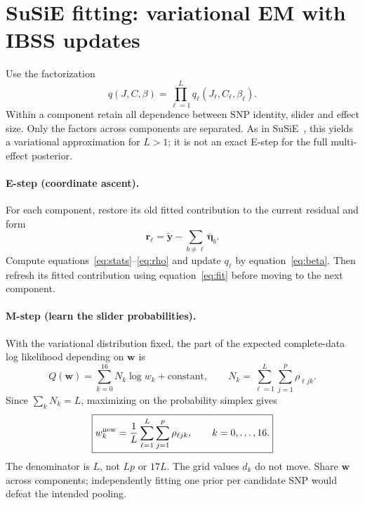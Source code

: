 \documentclass[11pt]{article}
\newcommand{\yb}{\widetilde{\mathbf y}}
\newcommand{\etal}{\overline{\boldsymbol\eta}}
\begin{document}
\newpage
\section{SuSiE fitting: variational EM with IBSS updates}
Use the factorization
\begin{equation}
 q(J,C,\beta)=\prod_{\ell=1}^L q_\ell(J_\ell,C_\ell,\beta_\ell).
 \label{eq:q}
\end{equation}
Within a component retain all dependence between SNP identity, slider and
effect size. Only the factors across components are separated. As in
SuSiE~\cite{susie}, this yields a variational approximation for $L>1$;
it is not an exact E-step for the full multi-effect posterior.

\paragraph{E-step (coordinate ascent).}
For each component, restore its old fitted contribution to the current
residual and form
\begin{equation}
 \mathbf r_\ell=\yb-\sum_{b\ne\ell}\etal_b.
 \label{eq:residual}
\end{equation}
Compute equations~\eqref{eq:stats}--\eqref{eq:rho} and update
$q_\ell$ by equation~\eqref{eq:beta}. Then refresh its fitted contribution
using equation~\eqref{eq:fit} before moving to the next component.

\paragraph{M-step (learn the slider probabilities).}
With the variational distribution fixed, the part of the expected
complete-data log likelihood depending on $\mathbf w$ is
\begin{equation}
 Q(\mathbf w)=\sum_{k=0}^{16}N_k\log w_k+\text{constant},
 \qquad N_k=\sum_{\ell=1}^L\sum_{j=1}^p\rho_{\ell jk}.
 \label{eq:Q}
\end{equation}
Since $\sum_kN_k=L$, maximizing on the probability simplex gives
\begin{equation}
 \boxed{\displaystyle
   w_k^{\rm new}=\frac1L\sum_{\ell=1}^L\sum_{j=1}^p\rho_{\ell jk},
   \qquad k=0,\ldots,16.}
 \label{eq:wupdate}
\end{equation}
The denominator is $L$, not $Lp$ or $17L$. The grid values $d_k$ do not
move. Share $\mathbf w$ across components; independently fitting one prior
per candidate SNP would defeat the intended pooling.
\end{document}
